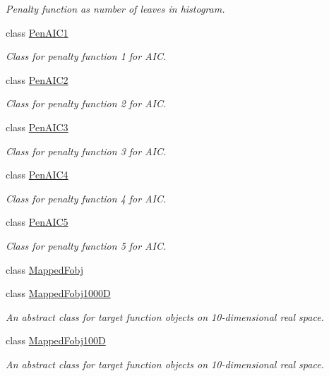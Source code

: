 \begin{DoxyCompactItemize}
\begin{DoxyCompactList}\small\item\em \-Penalty function as number of leaves in histogram. \end{DoxyCompactList}\item 
class \hyperlink{classsubpavings_1_1PenAIC1}{\-Pen\-A\-I\-C1}
\begin{DoxyCompactList}\small\item\em \-Class for penalty function 1 for \-A\-I\-C. \end{DoxyCompactList}\item 
class \hyperlink{classsubpavings_1_1PenAIC2}{\-Pen\-A\-I\-C2}
\begin{DoxyCompactList}\small\item\em \-Class for penalty function 2 for \-A\-I\-C. \end{DoxyCompactList}\item 
class \hyperlink{classsubpavings_1_1PenAIC3}{\-Pen\-A\-I\-C3}
\begin{DoxyCompactList}\small\item\em \-Class for penalty function 3 for \-A\-I\-C. \end{DoxyCompactList}\item 
class \hyperlink{classsubpavings_1_1PenAIC4}{\-Pen\-A\-I\-C4}
\begin{DoxyCompactList}\small\item\em \-Class for penalty function 4 for \-A\-I\-C. \end{DoxyCompactList}\item 
class \hyperlink{classsubpavings_1_1PenAIC5}{\-Pen\-A\-I\-C5}
\begin{DoxyCompactList}\small\item\em \-Class for penalty function 5 for \-A\-I\-C. \end{DoxyCompactList}\item 
class \hyperlink{classsubpavings_1_1MappedFobj}{\-Mapped\-Fobj}
\item 
class \hyperlink{classsubpavings_1_1MappedFobj1000D}{\-Mapped\-Fobj1000\-D}
\begin{DoxyCompactList}\small\item\em \-An abstract class for target function objects on 10-\/dimensional real space. \end{DoxyCompactList}\item 
class \hyperlink{classsubpavings_1_1MappedFobj100D}{\-Mapped\-Fobj100\-D}
\begin{DoxyCompactList}\small\item\em \-An abstract class for target function objects on 10-\/dimensional real space. \end{DoxyCompactList}\item 

\end{DoxyCompactItemize}
